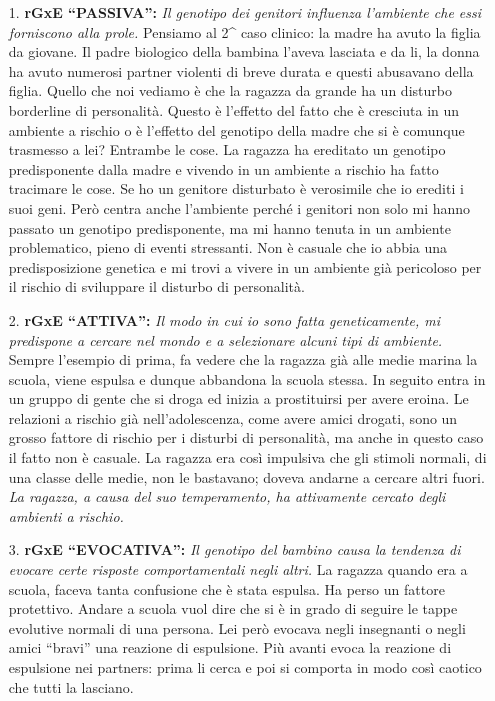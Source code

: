 \begin{itemize}
\item[1.]
  \textbf{rGxE ``PASSIVA'':} \emph{Il genotipo dei genitori influenza
  l'ambiente che essi forniscono alla prole.} Pensiamo al 2\^{} caso
  clinico: la madre ha avuto la figlia da giovane. Il padre biologico
  della bambina l'aveva lasciata e da li, la donna ha avuto numerosi
  partner violenti di breve durata e questi abusavano della figlia.
  Quello che noi vediamo è che la ragazza da grande ha un disturbo
  borderline di personalità. Questo è l'effetto del fatto che è
  cresciuta in un ambiente a rischio o è l'effetto del genotipo della
  madre che si è comunque trasmesso a lei? Entrambe le cose. La ragazza
  ha ereditato un genotipo predisponente dalla madre e vivendo in un
  ambiente a rischio ha fatto tracimare le cose. Se ho un genitore
  disturbato è verosimile che io erediti i suoi geni. Però centra anche
  l'ambiente perché i genitori non solo mi hanno passato un genotipo
  predisponente, ma mi hanno tenuta in un ambiente problematico, pieno
  di eventi stressanti. Non è casuale che io abbia una predisposizione
  genetica e mi trovi a vivere in un ambiente già pericoloso per il
  rischio di sviluppare il disturbo di personalità.
\item[2.]
  \textbf{rGxE ``ATTIVA'':} \emph{Il modo in cui io sono fatta
  geneticamente, mi predispone a cercare nel mondo e a selezionare
  alcuni tipi di ambiente.} Sempre l'esempio di prima, fa vedere che la
  ragazza già alle medie marina la scuola, viene espulsa e dunque
  abbandona la scuola stessa. In seguito entra in un gruppo di gente che
  si droga ed inizia a prostituirsi per avere eroina. Le relazioni a
  rischio già nell'adolescenza, come avere amici drogati, sono un grosso
  fattore di rischio per i disturbi di personalità, ma anche in questo
  caso il fatto non è casuale. La ragazza era così impulsiva che gli
  stimoli normali, di una classe delle medie, non le bastavano; doveva
  andarne a cercare altri fuori. \emph{La ragazza, a causa del suo
  temperamento, ha attivamente cercato degli ambienti a rischio.}
\item[3.]
  \textbf{rGxE ``EVOCATIVA'':} \emph{Il genotipo del bambino causa la
  tendenza di evocare certe risposte comportamentali negli altri.} La
  ragazza quando era a scuola, faceva tanta confusione che è stata
  espulsa. Ha perso un fattore protettivo. Andare a scuola vuol dire che
  si è in grado di seguire le tappe evolutive normali di una persona.
  Lei però evocava negli insegnanti o negli amici ``bravi'' una reazione
  di espulsione. Più avanti evoca la reazione di espulsione nei
  partners: prima li cerca e poi si comporta in modo così caotico che
  tutti la lasciano.
\end{itemize}

